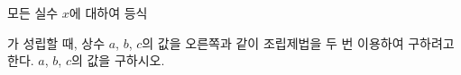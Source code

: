 \noindent\begin{minipage}[t]{0.58\linewidth}\vspace{0pt}\raggedright 모든 실수 $x$에 대하여 등식\par\smallskip\end{minipage}\hfill\begin{minipage}[t]{0.4\linewidth}\vspace{0pt}\centering \resizebox{\ifdim\width>\linewidth\linewidth\else\width\fi}{!}{}\end{minipage}\par
\noindent {}\par\smallskip\noindent 가 성립할 때, 상수 $a$, $b$, $c$의 값을 오른쪽과 같이 조립제법을 두 번 이용하여 구하려고 한다. $a$, $b$, $c$의 값을 구하시오.
